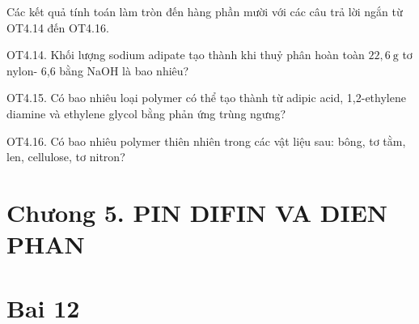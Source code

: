 \documentclass[10pt]{article}
\begin{document}
Các kết quả tính toán làm tròn đến hàng phần mười với các câu trả lời ngắn từ OT4.14 đến OT4.16.

OT4.14. Khối lượng sodium adipate tạo thành khi thuỷ phân hoàn toàn $22,6 \mathrm{~g}$ tơ nylon- 6,6 bằng NaOH là bao nhiêu?

OT4.15. Có bao nhiêu loại polymer có thể tạo thành từ adipic acid, 1,2-ethylene diamine và ethylene glycol bằng phản ứng trùng ngưng?

OT4.16. Có bao nhiêu polymer thiên nhiên trong các vật liệu sau: bông, tơ tằm, len, cellulose, tơ nitron?

\section*{Chưong 5. PIN DIFIN VA DIEN PHAN}
\section*{Bai 12}
\end{document}
